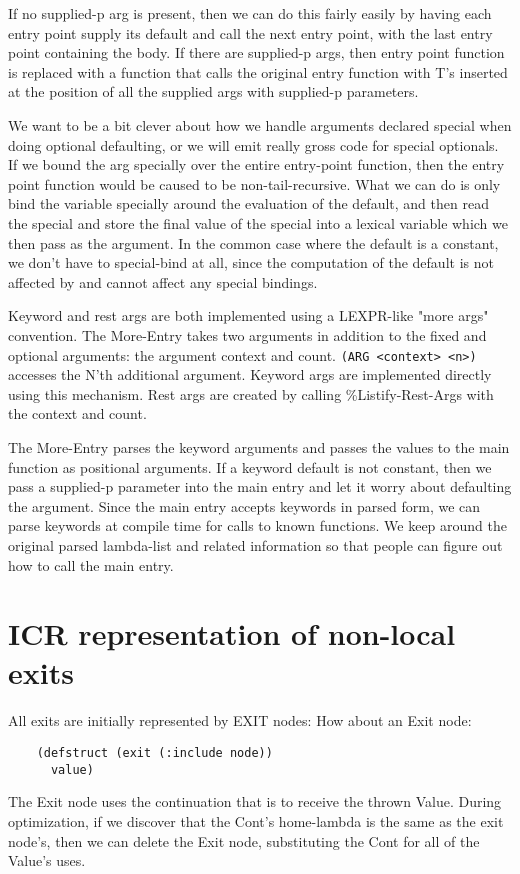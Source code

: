 If no supplied-p arg is present, then we can do this fairly easily by having
each entry point supply its default and call the next entry point, with the
last entry point containing the body.  If there are supplied-p args, then entry
point function is replaced with a function that calls the original entry
function with T's inserted at the position of all the supplied args with
supplied-p parameters.

We want to be a bit clever about how we handle arguments declared special when
doing optional defaulting, or we will emit really gross code for special
optionals.  If we bound the arg specially over the entire entry-point function,
then the entry point function would be caused to be non-tail-recursive.  What
we can do is only bind the variable specially around the evaluation of the
default, and then read the special and store the final value of the special
into a lexical variable which we then pass as the argument.  In the common case
where the default is a constant, we don't have to special-bind at all, since
the computation of the default is not affected by and cannot affect any special
bindings.

Keyword and rest args are both implemented using a LEXPR-like "more
args" convention.  The More-Entry takes two arguments in addition to
the fixed and optional arguments: the argument context and count.
\verb+(ARG <context> <n>)+ accesses the N'th additional argument.  Keyword
args are implemented directly using this mechanism.  Rest args are
created by calling \%Listify-Rest-Args with the context and count.

The More-Entry parses the keyword arguments and passes the values to the main
function as positional arguments.  If a keyword default is not constant, then
we pass a supplied-p parameter into the main entry and let it worry about
defaulting the argument.  Since the main entry accepts keywords in parsed form,
we can parse keywords at compile time for calls to known functions.  We keep
around the original parsed lambda-list and related information so that people
can figure out how to call the main entry.


\section{ICR representation of non-local exits}

All exits are initially represented by EXIT nodes:
How about an Exit node:
\begin{verbatim}
    (defstruct (exit (:include node))
      value)
\end{verbatim}
The Exit node uses the continuation that is to receive the thrown Value.
During optimization, if we discover that the Cont's home-lambda is the same as
the exit node's, then we can delete the Exit node, substituting the Cont for
all of the Value's uses.

